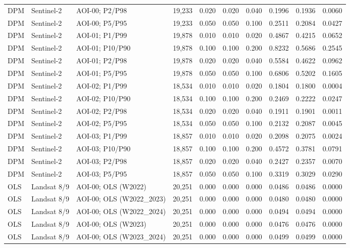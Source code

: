 \begin{landscape}
\begin{longtable}{lllrrrrrrr}
DPM & Sentinel-2 & AOI-00; P2/P98 & 19,233 & 0.020 & 0.020 & 0.040 & 0.1996 & 0.1936 & 0.0060 \\
DPM & Sentinel-2 & AOI-00; P5/P95 & 19,233 & 0.050 & 0.050 & 0.100 & 0.2511 & 0.2084 & 0.0427 \\
DPM & Sentinel-2 & AOI-01; P1/P99 & 19,878 & 0.010 & 0.010 & 0.020 & 0.4867 & 0.4215 & 0.0652 \\
DPM & Sentinel-2 & AOI-01; P10/P90 & 19,878 & 0.100 & 0.100 & 0.200 & 0.8232 & 0.5686 & 0.2545 \\
DPM & Sentinel-2 & AOI-01; P2/P98 & 19,878 & 0.020 & 0.020 & 0.040 & 0.5584 & 0.4622 & 0.0962 \\
DPM & Sentinel-2 & AOI-01; P5/P95 & 19,878 & 0.050 & 0.050 & 0.100 & 0.6806 & 0.5202 & 0.1605 \\
DPM & Sentinel-2 & AOI-02; P1/P99 & 18,534 & 0.010 & 0.010 & 0.020 & 0.1804 & 0.1800 & 0.0004 \\
DPM & Sentinel-2 & AOI-02; P10/P90 & 18,534 & 0.100 & 0.100 & 0.200 & 0.2469 & 0.2222 & 0.0247 \\
DPM & Sentinel-2 & AOI-02; P2/P98 & 18,534 & 0.020 & 0.020 & 0.040 & 0.1911 & 0.1901 & 0.0011 \\
DPM & Sentinel-2 & AOI-02; P5/P95 & 18,534 & 0.050 & 0.050 & 0.100 & 0.2132 & 0.2087 & 0.0045 \\
DPM & Sentinel-2 & AOI-03; P1/P99 & 18,857 & 0.010 & 0.010 & 0.020 & 0.2098 & 0.2075 & 0.0024 \\
DPM & Sentinel-2 & AOI-03; P10/P90 & 18,857 & 0.100 & 0.100 & 0.200 & 0.4572 & 0.3781 & 0.0791 \\
DPM & Sentinel-2 & AOI-03; P2/P98 & 18,857 & 0.020 & 0.020 & 0.040 & 0.2427 & 0.2357 & 0.0070 \\
DPM & Sentinel-2 & AOI-03; P5/P95 & 18,857 & 0.050 & 0.050 & 0.100 & 0.3319 & 0.3029 & 0.0290 \\
OLS & Landsat 8/9 & AOI-00; OLS (W2022) & 20,251 & 0.000 & 0.000 & 0.000 & 0.0486 & 0.0486 & 0.0000 \\
OLS & Landsat 8/9 & AOI-00; OLS (W2022\_2023) & 20,251 & 0.000 & 0.000 & 0.000 & 0.0480 & 0.0480 & 0.0000 \\
OLS & Landsat 8/9 & AOI-00; OLS (W2022\_2024) & 20,251 & 0.000 & 0.000 & 0.000 & 0.0494 & 0.0494 & 0.0000 \\
OLS & Landsat 8/9 & AOI-00; OLS (W2023) & 20,251 & 0.000 & 0.000 & 0.000 & 0.0476 & 0.0476 & 0.0000 \\
OLS & Landsat 8/9 & AOI-00; OLS (W2023\_2024) & 20,251 & 0.000 & 0.000 & 0.000 & 0.0499 & 0.0499 & 0.0000 \\

\end{longtable}
\end{landscape}
